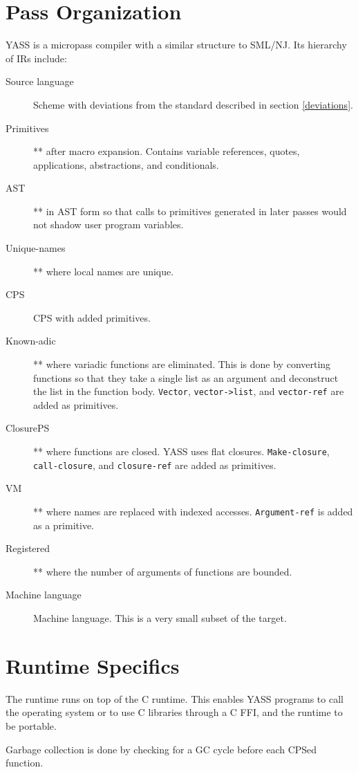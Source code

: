 \documentclass{article}
\newcommand{\name}{YASS}
\begin{document}
\section{Pass Organization}

\name{} is a micropass compiler with a similar structure to SML/NJ. Its hierarchy of IRs include:

\begin{description}
\item[Source language] Scheme with deviations from the standard described in section
  \ref{deviations}.
\item[Primitives] ** after macro expansion. Contains variable references, quotes,
  applications, abstractions, and conditionals.
\item[AST] ** in AST form so that calls to primitives generated in later passes would not
  shadow user program variables.
\item[Unique-names] ** where local names are unique.
\item[CPS] CPS with added primitives.
\item[Known-adic] ** where variadic functions are eliminated. This is done by converting
  functions so that they take a single list as an argument and deconstruct the list
  in the function body. \verb|Vector|, \verb|vector->list|, and \verb|vector-ref| are added as primitives.
\item[ClosurePS] ** where functions are closed. YASS uses flat closures.
  \verb|Make-closure|, \verb|call-closure|, and \verb|closure-ref| are added as primitives.
\item[VM] ** where names are replaced with indexed accesses. \verb|Argument-ref| is added
  as a primitive.
\item[Registered] ** where the number of arguments of functions are bounded.
\item[Machine language] Machine language. This is a very small subset of the
  target.
\end{description}

\section{Runtime Specifics}

The runtime runs on top of the C runtime. This enables \name{} programs
to call the operating system or to use C libraries through a C FFI, and
the runtime to be portable.

Garbage collection is done by checking for a GC cycle before each CPSed function.
\end{document}
